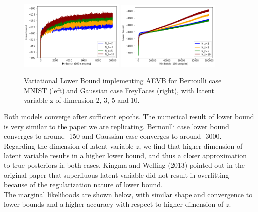 \documentclass[11pt]{article}
\begin{document}
\begin{figure}[H]
\begin{center}
\includegraphics[width = 0.45\textwidth]{fig/Bernoulli_lb}
\includegraphics[width = 0.45\textwidth]{fig/gaussian-lb}
\caption{Variational Lower Bound implementing AEVB for Bernoulli case MNIST (left) and Gaussian case FreyFaces (right), with latent variable z of dimension 2, 3, 5 and 10.} \label{fig:VB-LB}
\end{center}
\end{figure}

\noindent
Both models converge after sufficient epochs. The numerical result of lower bound is very similar to the paper we are replicating. Bernoulli case lower bound converges to around -150 and Gaussian case converges to around -3000. %
\\

\noindent
Regarding the dimension of latent variable $z$, we find that higher dimension of latent variable results in a higher lower bound, and thus a closer approximation to true posteriors in both cases. Kingma and Welling (2013) pointed out in the original paper that superfluous latent variable did not result in overfitting because of the regularization nature of lower bound.\\

\noindent
The marginal likelihoods are shown below, with similar shape and convergence to lower bounds and a higher accuracy with respect to higher dimension of $z$.
\end{document}
